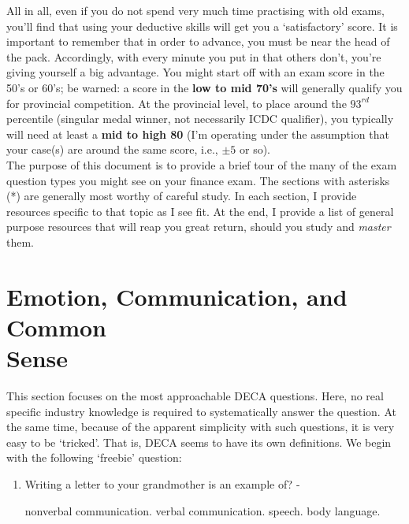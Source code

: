 \documentclass[12pt]{article}
\newcounter{choice}
\renewcommand\thechoice{\Alph{choice}}
\newcommand\choicelabel{\thechoice.}
\newenvironment{choices}%
  {\list{\choicelabel}%
     {\usecounter{choice}\def\makelabel##1{\hss\llap{##1}}%
       \settowidth{\leftmargin}{W.\hskip\labelsep\hskip 2.5em}%
       \def\choice{%
         \item
       } %
       \labelwidth\leftmargin\advance\labelwidth-\labelsep
       \topsep=0pt
       \partopsep=0pt
     }%
  }%
  {\endlist}
\begin{document}
	All in all, even if you do not spend very much time practising with old exams, you'll find that using your deductive skills will get you a \lq satisfactory' score. It is important to remember that in order to advance, you must be near the head of the pack. Accordingly, with every minute you put in that others don't, you're giving yourself a big advantage. You might start off with an exam score in the 50's or 60's; be warned: a score in the \textbf{low to mid 70's} will generally qualify you for provincial competition. At the provincial level, to place around the $\textrm{93}^{rd}$ percentile (singular medal winner, not necessarily ICDC qualifier), you typically will need at least a \textbf{mid to high 80} (I'm operating under the assumption that your case(s) are around the same score, i.e., $\pm 5$ or so). \\
	
	The purpose of this document is to provide a brief tour of the many of the exam question types you might see on your finance exam. The sections with asterisks (*) are generally most worthy of careful study. In each section, I provide resources specific to that topic as I see fit. At the end, I provide a list of general purpose resources that will reap you great return, should you study and \textit{master} them.
	
\section[Emotion, Communication, and Common Sense]{\texorpdfstring{Emotion, Communication, and Common \\ Sense}{Emotion, Communication, and Common Sense}}
This section focuses on the most approachable DECA questions. Here, no real specific industry knowledge is required to systematically answer the question. At the same time, because of the apparent simplicity with such questions, it is very easy to be \lq tricked'. That is, DECA seems to have its own definitions. We begin with the following \lq freebie' question: 

\begin{enumerate}
\item Writing a letter to your grandmother is an example of?
  \begin{choices}
    \choice nonverbal communication. 
    \choice verbal communication. 
    \choice speech.
    \choice body language.
  \end{choices}
\end{enumerate}
\end{document}
